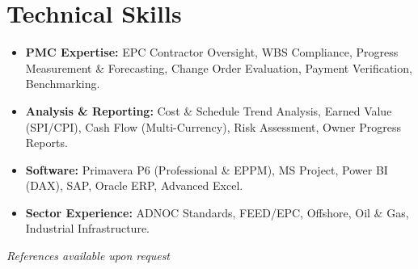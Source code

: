 \documentclass[11pt,a4paper]{article}
\begin{document}
\section{Technical Skills}
\begin{itemize}[label={\color{awesome-blue}\small\textbullet}, leftmargin=*, itemsep=0pt, parsep=0pt]
    \raggedright
    \item \textbf{PMC Expertise:} EPC Contractor Oversight, WBS Compliance, Progress Measurement \& Forecasting, Change Order Evaluation, Payment Verification, Benchmarking.
    \item \textbf{Analysis \& Reporting:} Cost \& Schedule Trend Analysis, Earned Value (SPI/CPI), Cash Flow (Multi-Currency), Risk Assessment, Owner Progress Reports.
    \item \textbf{Software:} Primavera P6 (Professional \& EPPM), MS Project, Power BI (DAX), SAP, Oracle ERP, Advanced Excel.
    \item \textbf{Sector Experience:} ADNOC Standards, FEED/EPC, Offshore, Oil \& Gas, Industrial Infrastructure.
\end{itemize}

\vfill
\begin{center}
    \textit{References available upon request}
\end{center}
\end{document}
